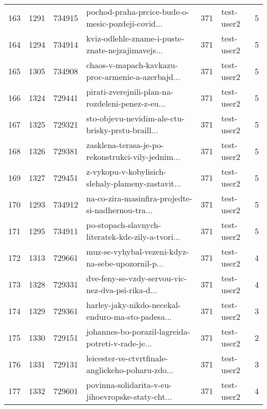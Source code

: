 \begin{tabular}{lrrlrlr}
163  &       1291 &   734915 &  pochod-praha-prcice-bude-o-mesic-pozdeji-covid... &      371 &                   test-user2 &               5 \\
164  &       1294 &   734914 &  kviz-odlehle-zname-i-puste-znate-nejzajimavejs... &      371 &                   test-user2 &               5 \\
165  &       1305 &   734908 &  chaos-v-mapach-kavkazu-proc-armenie-a-azerbajd... &      371 &                   test-user2 &               5 \\
166  &       1324 &   729441 &  pirati-zverejnili-plan-na-rozdeleni-penez-z-eu... &      371 &                   test-user2 &               5 \\
167  &       1325 &   729321 &  sto-objevu-nevidim-ale-ctu-brisky-prstu-braill... &      371 &                   test-user2 &               5 \\
168  &       1326 &   729381 &  zasklena-terasa-je-po-rekonstrukci-vily-jednim... &      371 &                   test-user2 &               5 \\
169  &       1327 &   729451 &  z-vykopu-v-kobylisich-slehaly-plameny-zastavit... &      371 &                   test-user2 &               5 \\
170  &       1293 &   734912 &  na-co-zira-masinfira-projedte-si-nadhernou-tra... &      371 &                   test-user2 &               5 \\
171  &       1295 &   734911 &  po-stopach-slavnych-literatek-kde-zily-a-tvori... &      371 &                   test-user2 &               5 \\
172  &       1313 &   729661 &  muz-se-vyhybal-vezeni-kdyz-na-sebe-upozornil-p... &      371 &                   test-user2 &               4 \\
173  &       1328 &   729331 &  dve-feny-se-vzdy-servou-vic-nez-dva-psi-rika-d... &      371 &                   test-user2 &               4 \\
174  &       1329 &   729361 &  harley-jaky-nikdo-necekal-enduro-ma-sto-padesa... &      371 &                   test-user2 &               3 \\
175  &       1330 &   729151 &  johannes-bo-porazil-lagreida-potreti-v-rade-je... &      371 &                   test-user2 &               2 \\
176  &       1331 &   729131 &  leicester-ve-ctvrtfinale-anglickeho-poharu-zdo... &      371 &                   test-user2 &               3 \\
177  &       1332 &   729601 &  povinna-solidarita-v-eu-jihoevropske-staty-cht... &      371 &                   test-user2 &               4 \\

\end{tabular}
